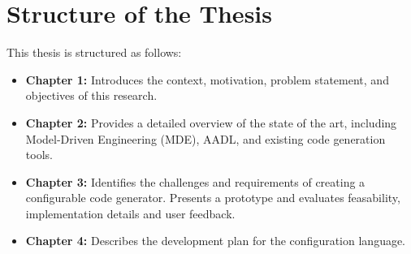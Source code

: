 \section{Structure of the Thesis}

This thesis is structured as follows:

\begin{itemize}
	\item \textbf{Chapter 1:} Introduces the context, motivation, problem statement, and objectives of this research.
	\item \textbf{Chapter 2:} Provides a detailed overview of the state of the art, including Model-Driven Engineering (MDE), \gls{AADL}, and existing code generation tools.
	\item \textbf{Chapter 3:} Identifies the challenges and requirements of creating a configurable code generator. Presents a prototype and evaluates feasability, implementation details and user feedback.
	\item \textbf{Chapter 4:} Describes the development plan for the configuration language.
\end{itemize}










